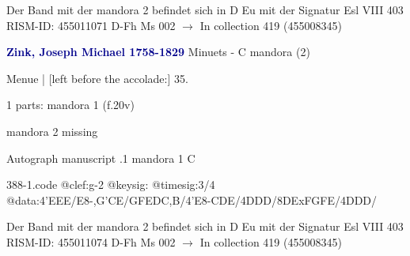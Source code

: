 \documentclass[twocolumn]{book}
\begin{document}
\newline Der Band mit der mandora 2 befindet sich in D Eu mit der Signatur Esl VIII 403
\newline RISM-ID: 455011071
\newline D-Fh  Ms 002
\newline $\rightarrow$ In collection 419 (455008345)
      
\newline \par \vspace{7pt} \textcolor{darkblue}{\textbf{Zink, Joseph Michael  1758-1829}}
\newline Minuets - C
\newline mandora (2)
\newline \begin{itshape}[f.20v, at left:] Menue | [left before the accolade:] 35.\end{itshape} 
\newline \textcolor{darkblue}{}  1 parts: mandora 1  (f.20v)
\newline \begin{small} mandora 2 missing\end{small} 
\newline Autograph manuscript
.1  mandora 1  C  
\begin{filecontents*}{388-1.code}
@clef:g-2
@keysig:
@timesig:3/4
@data:4'EEE/E8-,G'CE/GFEDC,B/4'E8-CDE/4DDD/8DExFGFE/4DDD/
\end{filecontents*}
\newline
%

\newline Der Band mit der mandora 2 befindet sich in D Eu mit der Signatur Esl VIII 403
\newline RISM-ID: 455011074
\newline D-Fh  Ms 002
\newline $\rightarrow$ In collection 419 (455008345)
      
\end{document}
